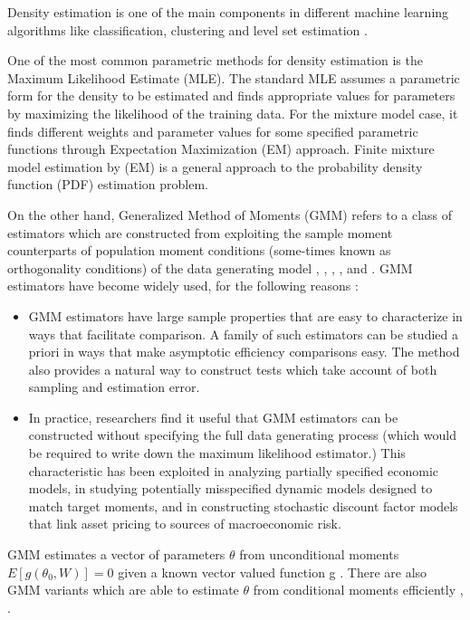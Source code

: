Density estimation is one of the main components in different machine learning algorithms like classification, clustering and level set estimation \cite{gopalakrishnaneecs}.

One of the most common parametric methods for density estimation is the Maximum Likelihood Estimate (MLE). The standard MLE assumes a parametric form for the density to be estimated and finds appropriate values for parameters by maximizing the likelihood of the training data. For the mixture model case, it finds different weights and parameter values for some specified parametric functions through Expectation Maximization (EM) approach. Finite mixture model estimation by (EM) is a general approach to the probability density function (PDF) estimation problem. 

On the other hand, Generalized Method of Moments (GMM) refers to a class of estimators which are constructed from exploiting the sample moment counterparts of population moment conditions (some-times known as orthogonality conditions) of the data generating model \cite{hansen1982large} ,\cite{cochrane2001asset} , \cite{arellano2003panel}, \cite{hall2005generalized}, and \cite{singleton2006rempirical}. 
GMM estimators have become widely used, for the following reasons \cite{hansen1982large}: 
\begin{itemize}
\item
GMM estimators have large sample properties that are easy to characterize in ways that facilitate comparison. A family of such estimators can be studied a priori in ways that make asymptotic efficiency comparisons easy. The method also provides a natural way to construct tests which take account of both sampling and estimation error.
\item
In practice, researchers find it useful that GMM estimators can be constructed without specifying the full data generating process (which would be required to write down the maximum likelihood estimator.) This characteristic has been exploited in analyzing partially specified economic models, in studying potentially misspecified dynamic models designed to match target moments, and in constructing stochastic discount factor models that link asset pricing to sources of macroeconomic risk.
\end{itemize}
GMM estimates a vector of parameters $\theta$ from unconditional moments $E[g(\theta_0,W)]=0$ given a known vector valued function g \cite{lewbel2007local}. There are also GMM variants which are able to estimate $\theta$ from conditional moments efficiently \cite{lewbel2007local} , \cite{chamberlain1987asymptotic}. 

